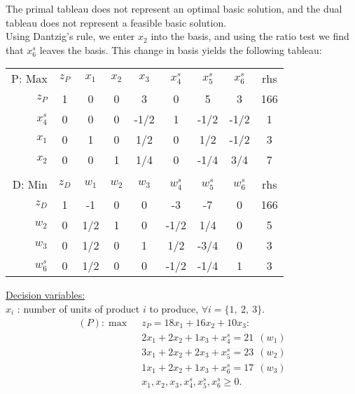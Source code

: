 \begin{solution}
The primal tableau does not represent an optimal basic solution, and the dual tableau does not represent a feasible basic solution. \\

Using Dantzig's rule, we enter $x_2$ into the basis, and using the ratio test we find that $x^s_6$ leaves the basis. This change in basis yields the following tableau:

\begin{center} \begin{tabular} {r|c|c|c|c|c|c|c|c|} \cline{2-9}  
P: Max&$z_P$ 	& $x_1$ 	& $x_2$ 	& $x_3$ 	& $x^{s}_4$	& $x^{s}_5$ 	& $x^{s}_6$ 	& rhs  \\ \cline{2-9}  \cline{2-9}   
$z_P$ 	& 1  		& 0     	& 0     	& 3      	& 0    	& 5     	& 3     	& 166  \\ \cline{2-9}  
$x^{s}_4$	& 0  		& 0     	& 0     	& -1/2   	& 1    	& -1/2  	& -1/2  	& 1   	\\ \cline{2-9} 
$x_1$	& 0  		& 1     	& 0     	& 1/2    	& 0    	& 1/2   	& -1/2  	& 3    \\ \cline{2-9}  
$x_2$	& 0  		& 0     	& 1     	& 1/4    	& 0    	& -1/4  	& 3/4   	& 7    \\ \cline{2-9} 
\multicolumn{9}{c}{ } \\ \cline{2-9}
D: Min& $z_D$ 	& $w_1$ 	& $w_2$ 	& $w_3$ 	& $w^{s}_4$ 	& $w^{s}_5$ 	& $w^{s}_6$ 	& rhs   \\ \cline{2-9} \cline{2-9}  
$z_D$ 	& 1    	& -1    	& 0     	& 0     	& -3    	& -7    	& 0     	& 166   \\ \cline{2-9}  
$w_2$	& 0    	& 1/2   	& 1     	& 0     	& -1/2  	& 1/4  	& 0     	& 5     \\ \cline{2-9}   
$w_3$ 	& 0    	& 1/2   	& 0     	& 1     	& 1/2  	& -3/4   	& 0     	& 3    \\ \cline{2-9}   
$w^{s}_6$	& 0    	& 1/2   	& 0     	& 0     	& -1/2   	& -1/4  	& 1     	& 3     \\ \cline{2-9} 
\end{tabular} \end{center}

\vspace{3mm}\underline{Decision variables:} \\
$x_i$ : number of units of product $i$ to produce, $\forall i = \{1,~2,~3\}$.
\begin{align*}
(P): \max~~  & z_P = 18x_1 + 16x_2 + 10x_3: \\
& 2x_1 + 2x_2 + 1x_3  +x^{s}_4 = 21~~ (w_1) \\
& 3x_1 + 2x_2 + 2x_3 + x^{s}_5 = 23~~ (w_2)  \\
&  1x_1 + 2x_2 + 1x_3  + x^{s}_6 = 17~~ (w_3) \\
& x_1, x_2, x_3, x^{s}_4, x^{s}_5, x^{s}_6 \ge 0.
\end{align*} 
\end{solution}

